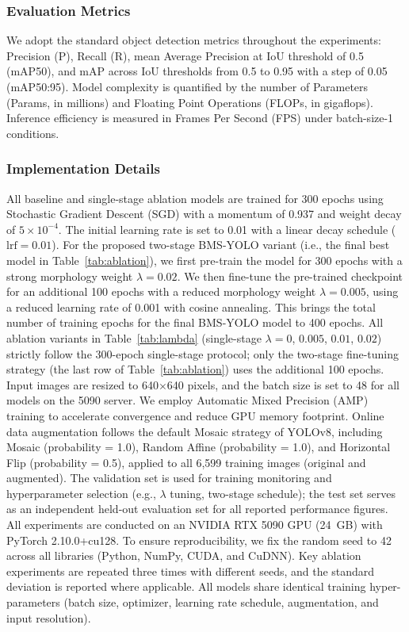 \documentclass{ieeeaccess}
\begin{document}
\subsubsection{Evaluation Metrics}
We adopt the standard object detection metrics throughout the experiments: Precision (P), Recall (R), mean Average Precision at IoU threshold of 0.5 (mAP50), and mAP across IoU thresholds from 0.5 to 0.95 with a step of 0.05 (mAP50:95). Model complexity is quantified by the number of Parameters (Params, in millions) and Floating Point Operations (FLOPs, in gigaflops). Inference efficiency is measured in Frames Per Second (FPS) under batch-size-1 conditions.

\subsubsection{Implementation Details}
All baseline and single-stage ablation models are trained for 300 epochs using Stochastic Gradient Descent (SGD) with a momentum of 0.937 and weight decay of $5 \times 10^{-4}$. The initial learning rate is set to 0.01 with a linear decay schedule ($\text{lrf} = 0.01$). For the proposed two-stage BMS-YOLO variant (i.e., the final best model in Table~\ref{tab:ablation}), we first pre-train the model for 300 epochs with a strong morphology weight $\lambda = 0.02$. We then fine-tune the pre-trained checkpoint for an additional 100 epochs with a reduced morphology weight $\lambda = 0.005$, using a reduced learning rate of 0.001 with cosine annealing. This brings the total number of training epochs for the final BMS-YOLO model to 400 epochs. All ablation variants in Table~\ref{tab:lambda} (single-stage $\lambda = 0$, $0.005$, $0.01$, $0.02$) strictly follow the 300-epoch single-stage protocol; only the two-stage fine-tuning strategy (the last row of Table~\ref{tab:ablation}) uses the additional 100 epochs. Input images are resized to 640$\times$640 pixels, and the batch size is set to 48 for all models on the 5090 server. We employ Automatic Mixed Precision (AMP) training to accelerate convergence and reduce GPU memory footprint. Online data augmentation follows the default Mosaic strategy of YOLOv8, including Mosaic (probability = 1.0), Random Affine (probability = 1.0), and Horizontal Flip (probability = 0.5), applied to all 6,599 training images (original and augmented). The validation set is used for training monitoring and hyperparameter selection (e.g., $\lambda$ tuning, two-stage schedule); the test set serves as an independent held-out evaluation set for all reported performance figures. All experiments are conducted on an NVIDIA RTX 5090 GPU (24~GB) with PyTorch 2.10.0+cu128. To ensure reproducibility, we fix the random seed to 42 across all libraries (Python, NumPy, CUDA, and CuDNN). Key ablation experiments are repeated three times with different seeds, and the standard deviation is reported where applicable. All models share identical training hyper-parameters (batch size, optimizer, learning rate schedule, augmentation, and input resolution).
\end{document}
